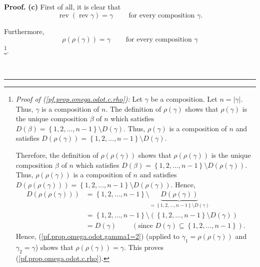 \documentclass
[numbers=enddot,12pt,final,onecolumn,notitlepage,abstracton]{scrartcl}%
\theoremstyle{definition}
\newenvironment{proof}[1][Proof]{\noindent\textbf{#1.} }{\ \rule{0.5em}{0.5em}}
\newenvironment{verlong}{}{}
\begin{document}
\begin{verlong}
\begin{proof}
\textbf{(c)} First of all, it is clear that%
\begin{equation}
\operatorname*{rev}\left(  \operatorname*{rev}\gamma\right)  =\gamma
\ \ \ \ \ \ \ \ \ \ \text{for every composition }\gamma.
\label{pf.prop.omega.odot.c.rev}%
\end{equation}


Furthermore,%
\begin{equation}
\rho\left(  \rho\left(  \gamma\right)  \right)  =\gamma
\ \ \ \ \ \ \ \ \ \ \text{for every composition }\gamma
\label{pf.prop.omega.odot.c.rho}%
\end{equation}
\footnote{\textit{Proof of (\ref{pf.prop.omega.odot.c.rho}):} Let $\gamma$ be
a composition. Let $n=\left\vert \gamma\right\vert $. Thus, $\gamma$ is a
composition of $n$. The definition of $\rho\left(  \gamma\right)  $ shows that
$\rho\left(  \gamma\right)  $ is the unique composition $\beta$ of $n$ which
satisfies $D\left(  \beta\right)  =\left\{  1,2,\ldots,n-1\right\}  \setminus
D\left(  \gamma\right)  $. Thus, $\rho\left(  \gamma\right)  $ is a
composition of $n$ and satisfies $D\left(  \rho\left(  \gamma\right)  \right)
=\left\{  1,2,\ldots,n-1\right\}  \setminus D\left(  \gamma\right)  $.
\par
Therefore, the definition of $\rho\left(  \rho\left(  \gamma\right)  \right)
$ shows that $\rho\left(  \rho\left(  \gamma\right)  \right)  $ is the unique
composition $\beta$ of $n$ which satisfies $D\left(  \beta\right)  =\left\{
1,2,\ldots,n-1\right\}  \setminus D\left(  \rho\left(  \gamma\right)  \right)
$. Thus, $\rho\left(  \rho\left(  \gamma\right)  \right)  $ is a composition
of $n$ and satisfies $D\left(  \rho\left(  \rho\left(  \gamma\right)  \right)
\right)  =\left\{  1,2,\ldots,n-1\right\}  \setminus D\left(  \rho\left(
\gamma\right)  \right)  $. Hence,%
\begin{align*}
D\left(  \rho\left(  \rho\left(  \gamma\right)  \right)  \right)   &
=\left\{  1,2,\ldots,n-1\right\}  \setminus\underbrace{D\left(  \rho\left(
\gamma\right)  \right)  }_{=\left\{  1,2,\ldots,n-1\right\}  \setminus
D\left(  \gamma\right)  }\\
&  =\left\{  1,2,\ldots,n-1\right\}  \setminus\left(  \left\{  1,2,\ldots
,n-1\right\}  \setminus D\left(  \gamma\right)  \right) \\
&  =D\left(  \gamma\right)  \ \ \ \ \ \ \ \ \ \ \left(  \text{since }D\left(
\gamma\right)  \subseteq\left\{  1,2,\ldots,n-1\right\}  \right)  .
\end{align*}
Hence, (\ref{pf.prop.omega.odot.gamma1=2}) (applied to $\gamma_{1}=\rho\left(
\rho\left(  \gamma\right)  \right)  $ and $\gamma_{2}=\gamma$) shows that
$\rho\left(  \rho\left(  \gamma\right)  \right)  =\gamma$. This proves
(\ref{pf.prop.omega.odot.c.rho}).}.


\end{proof}
\end{verlong}
\end{document}
